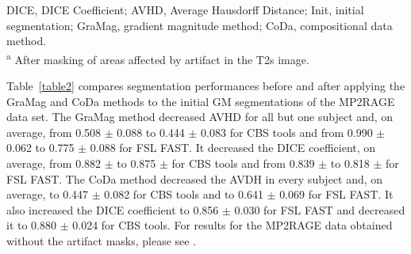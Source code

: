\begin{table}[!ht]
\begin{tabular}{llllll}
\end{tabular}
\begin{flushleft}
DICE, DICE Coefficient; AVHD, Average Hausdorff Distance; Init, initial segmentation; GraMag, gradient magnitude method; CoDa, compositional data method.\\
\textsuperscript{a} After masking of areas affected by artifact in the T2s image.
\end{flushleft}
\label{table1}
\end{table}

Table~\ref{table2} compares segmentation performances before and after applying the GraMag and CoDa methods to the initial GM segmentations of the MP2RAGE data set. The GraMag method decreased AVHD for all but one subject and, on average, from 0.508 $\pm$ 0.088 to 0.444 $\pm$ 0.083 for CBS tools and from 0.990 $\pm$ 0.062 to 0.775 $\pm$ 0.088 for FSL FAST. It decreased the DICE coefficient, on average, from 0.882 $\pm$ to 0.875 $\pm$ for CBS tools and from 0.839 $\pm$ to 0.818 $\pm$ for FSL FAST. The CoDa method decreased the AVDH in every subject and, on average, to 0.447 $\pm$ 0.082 for CBS tools and to 0.641 $\pm$ 0.069 for FSL FAST. It also increased the DICE coefficient to 0.856 $\pm$ 0.030 for FSL FAST and decreased it to 0.880 $\pm$ 0.024 for CBS tools. For results for the MP2RAGE data obtained without the artifact masks, please see .

